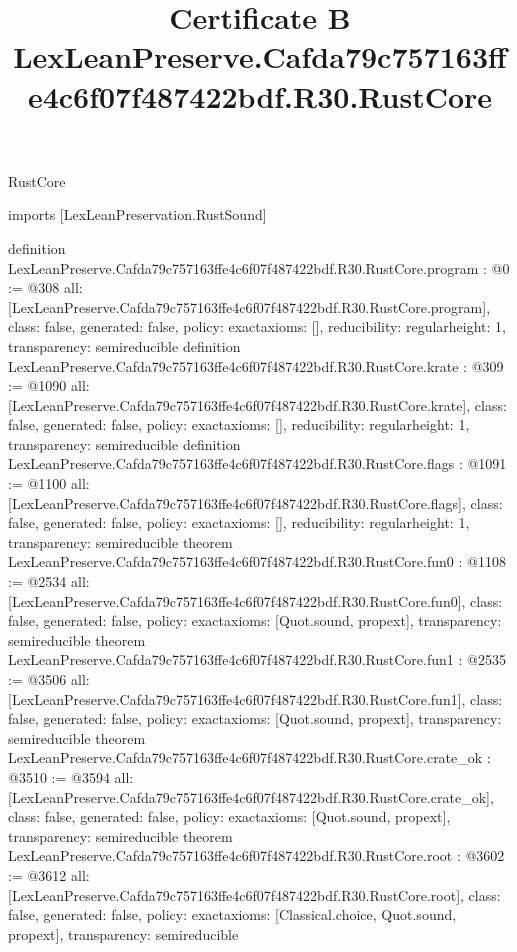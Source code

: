 \begin{lexlean}{RustCore}
\title{Certificate B LexLeanPreserve.Cafda79c757163ffe4c6f07f487422bdf.R30.RustCore}
\begin{coremodule}
imports [LexLeanPreservation.RustSound]

definition LexLeanPreserve.Cafda79c757163ffe4c6f07f487422bdf.R30.RustCore.program : @0 := @308 {
  all: [LexLeanPreserve.Cafda79c757163ffe4c6f07f487422bdf.R30.RustCore.program],
  class: false,
  generated: false,
  policy: exact{axioms: []},
  reducibility: regular{height: 1},
  transparency: semireducible
}
definition LexLeanPreserve.Cafda79c757163ffe4c6f07f487422bdf.R30.RustCore.krate : @309 := @1090 {
  all: [LexLeanPreserve.Cafda79c757163ffe4c6f07f487422bdf.R30.RustCore.krate],
  class: false,
  generated: false,
  policy: exact{axioms: []},
  reducibility: regular{height: 1},
  transparency: semireducible
}
definition LexLeanPreserve.Cafda79c757163ffe4c6f07f487422bdf.R30.RustCore.flags : @1091 := @1100 {
  all: [LexLeanPreserve.Cafda79c757163ffe4c6f07f487422bdf.R30.RustCore.flags],
  class: false,
  generated: false,
  policy: exact{axioms: []},
  reducibility: regular{height: 1},
  transparency: semireducible
}
theorem LexLeanPreserve.Cafda79c757163ffe4c6f07f487422bdf.R30.RustCore.fun0 : @1108 := @2534 {
  all: [LexLeanPreserve.Cafda79c757163ffe4c6f07f487422bdf.R30.RustCore.fun0],
  class: false,
  generated: false,
  policy: exact{axioms: [Quot.sound, propext]},
  transparency: semireducible
}
theorem LexLeanPreserve.Cafda79c757163ffe4c6f07f487422bdf.R30.RustCore.fun1 : @2535 := @3506 {
  all: [LexLeanPreserve.Cafda79c757163ffe4c6f07f487422bdf.R30.RustCore.fun1],
  class: false,
  generated: false,
  policy: exact{axioms: [Quot.sound, propext]},
  transparency: semireducible
}
theorem LexLeanPreserve.Cafda79c757163ffe4c6f07f487422bdf.R30.RustCore.crate_ok : @3510 := @3594 {
  all: [LexLeanPreserve.Cafda79c757163ffe4c6f07f487422bdf.R30.RustCore.crate_ok],
  class: false,
  generated: false,
  policy: exact{axioms: [Quot.sound, propext]},
  transparency: semireducible
}
theorem LexLeanPreserve.Cafda79c757163ffe4c6f07f487422bdf.R30.RustCore.root : @3602 := @3612 {
  all: [LexLeanPreserve.Cafda79c757163ffe4c6f07f487422bdf.R30.RustCore.root],
  class: false,
  generated: false,
  policy: exact{axioms: [Classical.choice, Quot.sound, propext]},
  transparency: semireducible
}


\end{coremodule}
\end{lexlean}
